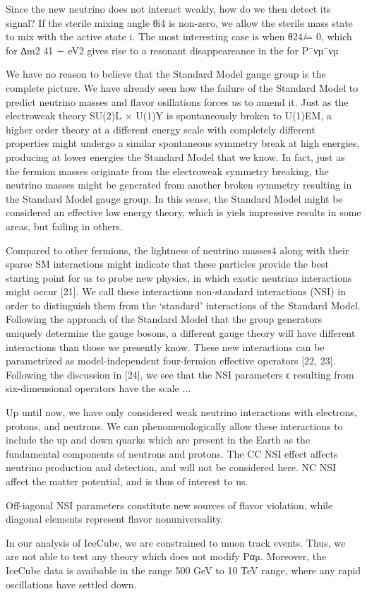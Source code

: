 \documentclass{article}
\begin{document}
Since the new neutrino does not interact weakly, how do we then detect its signal? If the sterile mixing
angle θi4 is non-zero, we allow the sterile mass state to mix with the active state i. The most interesting
case is when θ24 ̸= 0, which for ∆m2
41 ∼ eV2 gives rise to a resonant disappeareance in the for P¯νµ¯νµ


We have no reason to believe that the Standard Model gauge group is the complete picture. We have
already seen how the failure of the Standard Model to predict neutrino masses and flavor osillations forces
us to amend it. Just as the electroweak theory SU(2)L × U(1)Y is spontaneously broken to U(1)EM,
a higher order theory at a different energy scale with completely different properties might undergo a
similar spontaneous symmetry break at high energies, producing at lower energies the Standard Model
that we know. In fact, just as the fermion masses originate from the electroweak symmetry breaking,
the neutrino masses might be generated from another broken symmetry resulting in the Standard Model
gauge group. In this sense, the Standard Model might be considered an effective low energy theory,
which is yiels impressive results in some areas, but failing in others.

Compared to other fermions, the lightness of neutrino masses4 along with their sparse SM interactions
might indicate that these particles provide the best starting point for us to probe new physics, in which
exotic neutrino interactions might occur [21]. We call these interactions non-standard interactions (NSI)
in order to distinguish them from the ‘standard’ interactions of the Standard Model.
Following the approach of the Standard Model that the group generators uniquely determine the gauge
bosons, a different gauge theory will have different interactions than those we presently know. These
new interactions can be parametrized as model-independent four-fermion effective operators [22, 23].
Following the discussion in [24], we see that the NSI parameters ϵ resulting from six-dimensional operators
have the scale ...

Up until now, we have only considered weak neutrino interactions with electrons, protons, and neutrons.
We can phenomenologically allow these interactions to include the up and down quarks which are present
in the Earth as the fundamental components of neutrons and protons.
The CC NSI effect affects neutrino production and
detection, and will not be considered here. NC NSI affect the matter potential, and is thus of interest
to us.

Off-iagonal NSI parameters constitute new sources of flavor violation, while diagonal elements represent 
flavor nonuniversality.

In our analysis of IceCube, we are constrained to muon track events. Thus, we are not able to test any
theory which does not modify Pαµ. Moreover, the IceCube data is avaibable in the range 500 GeV to
10 TeV range, where any rapid oscillations have settled down.
\end{document}
